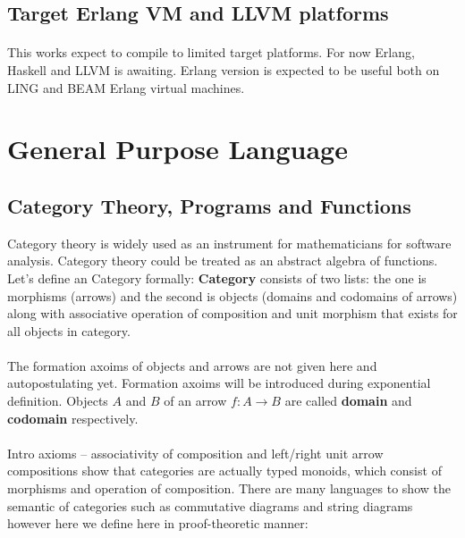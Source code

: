 \documentclass[11pt,oneside]{article}
\begin{document}
\subsection{Target Erlang VM and LLVM platforms}

   \paragraph{}
   This works expect to compile to limited target platforms. For now Erlang, Haskell and LLVM is awaiting.
   Erlang version is expected to be useful both on LING and BEAM Erlang virtual machines.

\newpage
\section{General Purpose Language}
\vspace{0.3cm}

   \subsection{Category Theory, Programs and Functions}
   Category theory is widely used as an instrument for mathematicians for software analysis.
   Category theory could be treated as an abstract algebra of functions. Let's define an Category
   formally: {\bf Category} consists of two lists: the one is morphisms (arrows) and the second is
   objects (domains and codomains of arrows) along with associative operation of composition and
   unit morphism that exists for all objects in category.

   \paragraph{}
   The formation axoims of objects and arrows are not given here and autopostulating yet. Formation axoims
   will be introduced during exponential definition. Objects $A$ and $B$ of an arrow $f: A \rightarrow B$
   are called {\bf domain} and {\bf codomain} respectively.

   \paragraph{}
   Intro axioms -- associativity of composition and left/right unit arrow compositions show that
   categories are actually typed monoids, which consist of morphisms and operation of composition.
   There are many languages to show the semantic of categories such as commutative diagrams and string diagrams
   however here we define here in proof-theoretic manner:
\end{document}
